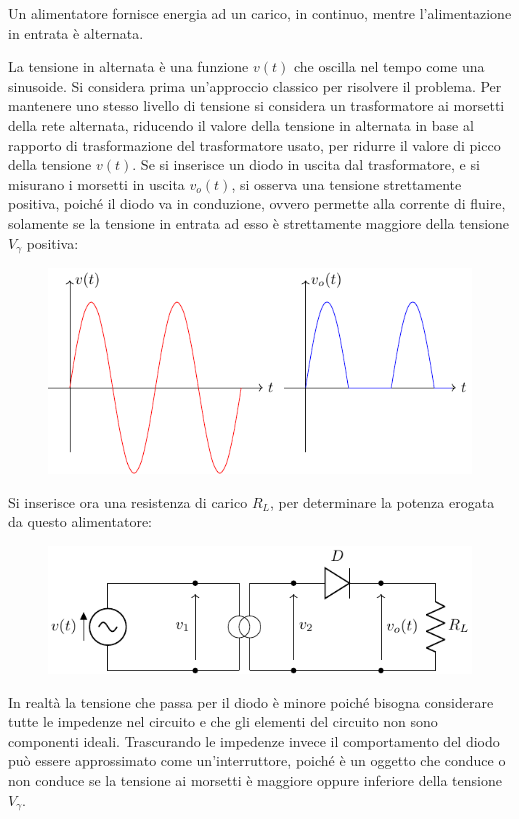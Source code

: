\documentclass{article}
\numberwithin{equation}{subsection}
\begin{document}
Un alimentatore fornisce energia ad un carico, in continuo, mentre l'alimentazione in entrata è alternata. 

La tensione in alternata è una funzione $v(t)$ che oscilla nel tempo come una sinusoide. 
Si considera prima un'approccio classico per risolvere il problema. 
Per mantenere uno stesso livello di tensione si considera un trasformatore ai 
morsetti della rete alternata, riducendo il valore della tensione in alternata in base al rapporto di trasformazione del trasformatore usato, per ridurre il valore di picco 
della tensione $v(t)$. 
Se si inserisce un diodo in uscita dal trasformatore, e si misurano i morsetti in uscita $v_o(t)$, si osserva una tensione strettamente positiva, poiché il diodo va 
in conduzione, ovvero permette alla corrente di fluire, solamente se la tensione in entrata ad esso è strettamente maggiore della tensione $V_{\gamma}$ positiva:
\begin{figure}[H]%
    \centering
    \includegraphics{andamento-alimentatore-diodo.pdf}%
    \label{fig:andamento-alimentatore-diodo}
\end{figure}
Si inserisce ora una resistenza di carico $R_L$, per determinare la potenza erogata da questo alimentatore:
\begin{figure}[H]%
    \centering
    \includegraphics{alimentatore-diodo.pdf}%
    \label{fig:alimentatore-diodo}
\end{figure}

In realtà la tensione che passa per il diodo è minore poiché bisogna considerare tutte le impedenze nel circuito e che gli elementi del circuito non sono componenti 
ideali. Trascurando le impedenze invece il comportamento del diodo 
può essere approssimato come un'interruttore, poiché è un oggetto che conduce o non conduce se la tensione ai morsetti è maggiore oppure inferiore della tensione $V_{\gamma}$. 
\end{document}
